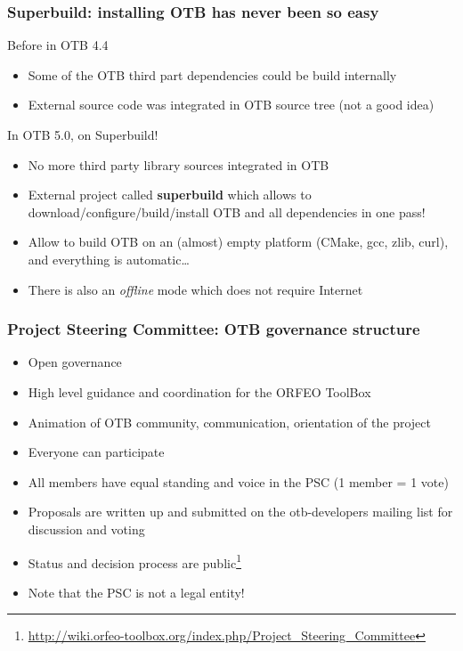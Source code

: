 \documentclass[8pt]{beamer}
\begin{document}
\begin{frame}
\frametitle{Superbuild: installing OTB has never been so easy}
\begin{block}{Before in OTB 4.4}
\begin{itemize}
\item Some of the OTB third part dependencies could be build internally
\item External source code was integrated in OTB source tree (not a good idea)
\end{itemize}
\end{block}

\begin{block}{In OTB 5.0, on Superbuild!}
\begin{itemize}
\item No more third party library sources integrated in OTB
\item External project called \textbf{superbuild} which allows to
  download/configure/build/install OTB and all dependencies in one pass!
\item Allow to build OTB on an (almost) empty platform (CMake, gcc, zlib, curl),
  and everything is automatic\ldots
\item There is also an \textit{offline} mode which does not require Internet
\end{itemize}
\end{block}
\end{frame}

\begin{frame}
\frametitle{Project Steering Committee: OTB governance structure}
\begin{itemize}
\item Open governance
\item High level guidance and coordination for the ORFEO ToolBox
\item Animation of OTB community, communication, orientation of the project
\item Everyone can participate
\item All members have equal standing and voice in the PSC (1 member = 1 vote)
\item Proposals are written up and submitted on the otb-developers mailing list for discussion and voting
\item Status and decision process are
  public\footnote{\url{http://wiki.orfeo-toolbox.org/index.php/Project_Steering_Committee}}
\item Note that the PSC is not a legal entity!
\end{itemize}
\end{frame}
\end{document}
